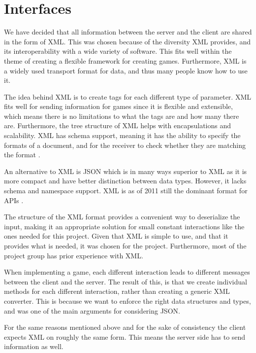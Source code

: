 \section{Interfaces} \label{subsec:interfaces}

We have decided that all information between the server and the client are shared in the form of XML. This was chosen because of the diversity XML provides, and its interoperability with a wide variety of software. This fits well within the theme of creating a flexible framework for creating games. Furthermore, XML is a widely used transport format for data, and thus many people know how to use it.

The idea behind XML is to create tags for each different type of parameter. XML fits well for sending information for games since it is flexible and extensible, which means there is no limitations to what the tags are and how many there are. Furthermore, the tree structure of XML helps with encapsulations and scalability. XML has schema support, meaning it has the ability to specify the formats of a document, and for the receiver to check whether they are matching the format \cite{xml}.

An alternative to XML is JSON which is in many ways superior to XML as it is more compact and have better distinction between data types. However, it lacks schema and namespace support. XML is as of 2011 still the dominant format for APIs \cite{xml-json}.

The structure of the XML format provides a convenient way to deserialize the input, making it an appropriate solution for small constant interactions like the ones needed for this project. Given that XML is simple to use, and that it provides what is needed, it was chosen for the project. Furthermore, most of the project group has prior experience with XML.

When implementing a game, each different interaction leads to different messages between the client and the server. The result of this, is that we create individual methods for each different interaction, rather than creating a generic XML converter. This is because we want to enforce the right data structures and types, and was one of the main arguments for considering JSON.

For the same reasons mentioned above and for the sake of consistency the client expects XML on roughly the same form. This means the server side has to send information as well.